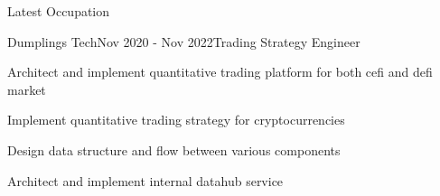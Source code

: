 \documentclass{resume} %
\begin{document}
\begin{rSection}{Latest Occupation}

\begin{rSubsection}{Dumplings Tech}{Nov 2020 - Nov 2022}{Trading Strategy Engineer}{}{}
\begin{rSubsectionList}
\item Architect and implement quantitative trading platform for both cefi and defi market
\item Implement quantitative trading strategy for cryptocurrencies
\item Design data structure and flow between various components 
\item Architect and implement internal datahub service
\end{rSubsectionList}
\end{rSubsection}
\end{rSection}
\end{document}
